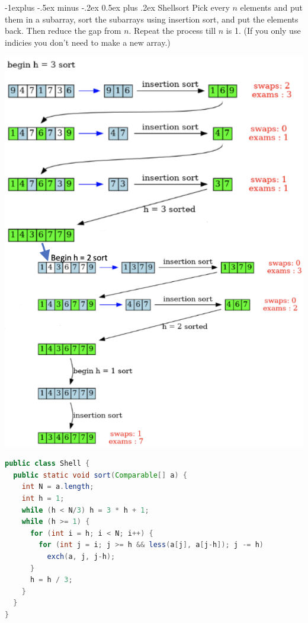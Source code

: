 \documentclass[letterpaper, 8pt]{extarticle}
\makeatletter
\renewcommand{\subsection}{\@startsection{subsection}{2}{0mm}%
                                {-1explus -.5ex minus -.2ex}%
                                {0.5ex plus .2ex}%
                                {\normalfont\small\bfseries}}
\makeatother
\begin{document}
\begin{multicols*}{4}
  \subsection{Shellsort}
  Pick every $n$ elements and put them in a subarray,
  sort the subarrays using insertion sort, and put the elements back. Then reduce the gap from $n$.
  Repeat the process till $n$ is 1.
  (If you only use indicies you don't need to make a new array.)
  \begin{center}
    \includegraphics[width=\linewidth]{shellsort.png}
  \end{center}
  \begin{lstlisting}[language=Java, breaklines=true, postbreak=\mbox{\textcolor{red}{$\hookrightarrow$}\space}]
public class Shell {
  public static void sort(Comparable[] a) {
    int N = a.length;
    int h = 1;
    while (h < N/3) h = 3 * h + 1;
    while (h >= 1) {
      for (int i = h; i < N; i++) {
        for (int j = i; j >= h && less(a[j], a[j-h]); j -= h)
          exch(a, j, j-h);
      }
      h = h / 3;
    }
  }
}
  \end{lstlisting}


\end{multicols*}
\end{document}
